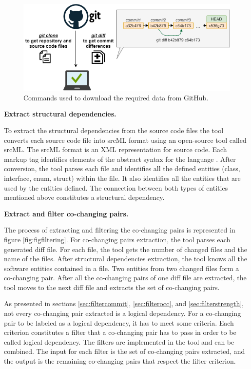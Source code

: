 \documentclass[12pt]{mitthesis}
\begin{document}
\begin{figure}[H]
\centering
\includegraphics[width=\textwidth]{gitdata.png}
\caption{Commands used to download the required data from GitHub.}
\label{fig:figgitdata}
\end{figure}

\textbf{Extract structural dependencies.}

To extract the structural dependencies from the source code files the tool converts each source code file into srcML format using an open-source tool called srcML. The srcML format is an XML representation for source code. Each markup tag identifies elements of the abstract syntax for the language \cite{srcML}. 
After conversion, the tool parses each file and identifies all the defined entities (class, interface, enum, struct) within the file. It also identifies all the entities that are used by the entities defined.  The connection between both types of entities mentioned above constitutes a structural dependency.

\textbf{Extract and filter co-changing pairs.}

The process of extracting and filtering the co-changing pairs is represented in figure \ref{fig:figfiltering}.
For co-changing pairs extraction, the tool parses each generated diff file.
For each file, the tool gets the number of changed files and the name of the files. 
After structural dependencies extraction, the tool knows all the software entities contained in a file. Two entities from two changed files form a co-changing pair. After all the co-changing pairs of one diff file are extracted, the tool moves to the next diff file and extracts the set of co-changing pairs.

As presented in sections \ref{sec:filtercommit}, \ref{sec:filterocc}, and \ref{sec:filterstrength}, not every co-changing pair extracted is a logical dependency. For a co-changing pair to be labeled as a logical dependency, it has to meet some criteria. Each criterion constitutes a filter that a co-changing pair has to pass in order to be called logical dependency.
The filters are implemented in the tool and can be combined. The input for each filter is the set of co-changing pairs extracted, and the output is the remaining co-changing pairs that respect the filter criterion.
\end{document}
